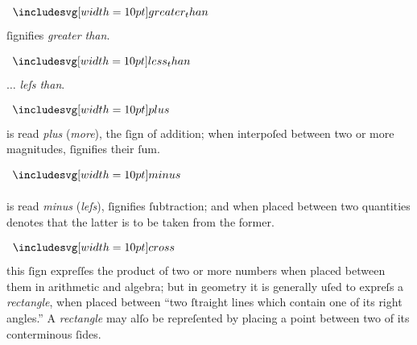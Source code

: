 \begin{minipage}[t]{0.20\textwidth}
    \begin{center}
        $\bgt$
    \end{center}
\end{minipage}%
\begin{minipage}[t]{0.80\textwidth}
    ſignifies \textit{greater than}.
\end{minipage}

\begin{minipage}[t]{0.20\textwidth}
    \begin{center}
        $\blt$
    \end{center}
\end{minipage}%
\begin{minipage}[t]{0.80\textwidth}
    $\ldots$ \textit{leſs than}.
\end{minipage}

\begin{minipage}[t]{0.20\textwidth}
    \begin{center}
        $\bplus$
    \end{center}
\end{minipage}%
\begin{minipage}[t]{0.80\textwidth}
    is read \textit{plus} (\textit{more}), the ſign of addition; when interpoſed between two or more magnitudes, ſignifies their ſum.
\end{minipage}

\begin{minipage}[t]{0.20\textwidth}
    \begin{center}
        $\bminus$
    \end{center}
\end{minipage}%
\begin{minipage}[t]{0.80\textwidth}
    is read \textit{minus} (\textit{leſs}), ſignifies ſubtraction; and when placed between two quantities denotes that the latter is to be taken from the former.
\end{minipage}

\begin{minipage}[t]{0.20\textwidth}
    \begin{center}
        $\bcross$
    \end{center}
\end{minipage}%
\begin{minipage}[t]{0.80\textwidth}
    this ſign expreſſes the product of two or more numbers when placed between them in arithmetic and algebra; but in geometry it is generally uſed to expreſs a \textit{rectangle}, when placed between “two ſtraight lines which contain one of its right angles.” A \textit{rectangle} may alſo be repreſented by placing a point between two of its conterminous ſides.
\end{minipage}

